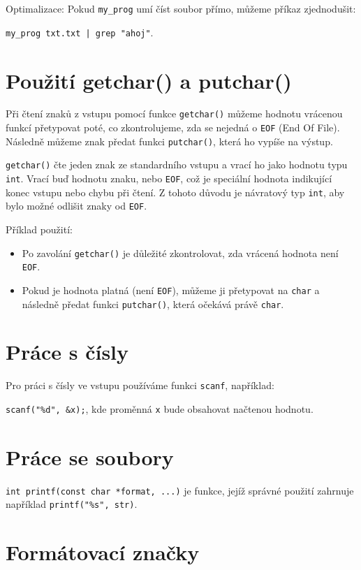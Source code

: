 \documentclass{article}
\begin{document}
Optimalizace: Pokud \texttt{my\_prog} umí číst soubor přímo, můžeme příkaz zjednodušit:

\texttt{my\_prog txt.txt | grep "ahoj"}.

\section{Použití getchar() a putchar()}

Při čtení znaků z vstupu pomocí funkce \texttt{getchar()} můžeme hodnotu vrácenou funkcí přetypovat poté,
co zkontrolujeme, zda se nejedná o \texttt{EOF} (End Of File). Následně můžeme znak předat funkci \texttt{putchar()},
která ho vypíše na výstup.

\texttt{getchar()} čte jeden znak ze standardního vstupu a vrací ho jako hodnotu typu \texttt{int}.
Vrací buď hodnotu znaku, nebo \texttt{EOF}, což je speciální hodnota indikující konec vstupu nebo chybu při čtení.
Z tohoto důvodu je návratový typ \texttt{int}, aby bylo možné odlišit znaky od \texttt{EOF}.

Příklad použití:

\begin{itemize}
    \item Po zavolání \texttt{getchar()} je důležité zkontrolovat, zda vrácená hodnota není \texttt{EOF}.
    \item Pokud je hodnota platná (není \texttt{EOF}), můžeme ji přetypovat na \texttt{char} a následně předat funkci \texttt{putchar()}, která očekává právě \texttt{char}.
\end{itemize}

\section{Práce s čísly}

Pro práci s čísly ve vstupu používáme funkci \texttt{scanf}, například:

\texttt{scanf("\%d", \&x);}, kde proměnná \texttt{x} bude obsahovat načtenou hodnotu.

\section{Práce se soubory}

\texttt{int printf(const char *format, ...)} je funkce, jejíž správné použití zahrnuje například \texttt{printf("\%s", str)}.

\section{Formátovací značky}
\end{document}

